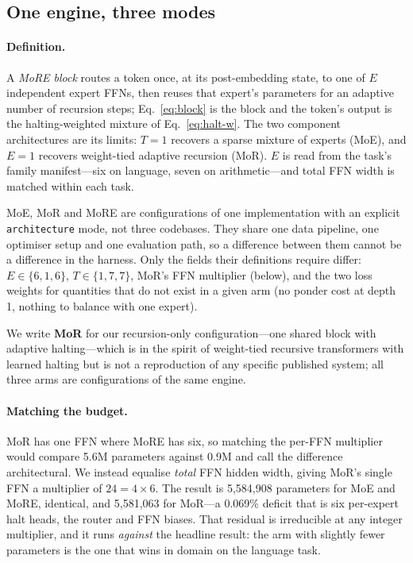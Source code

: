 \subsection{One engine, three modes}
\label{sec:engine}

\paragraph{Definition.}
A \emph{MoRE block} routes a token once, at its post-embedding state, to one of
$E$ independent expert FFNs, then reuses that expert's parameters for an adaptive
number of recursion steps; Eq.~\ref{eq:block} is the block and the token's output
is the halting-weighted mixture of Eq.~\ref{eq:halt-w}. The two component
architectures are its limits: $T=1$ recovers a sparse mixture of experts (MoE),
and $E=1$ recovers weight-tied adaptive recursion (MoR). $E$ is read from the
task's family manifest---six on language, seven on arithmetic---and total FFN
width is matched within each task.

MoE, MoR and MoRE are configurations of one implementation with an explicit
\texttt{architecture} mode, not three codebases. They share one data pipeline, one
optimiser setup and one evaluation path, so a difference between them cannot be a
difference in the harness. Only the fields their definitions require differ:
$E \in \{6,1,6\}$, $T \in \{1,7,7\}$, MoR's FFN multiplier (below), and the two
loss weights for quantities that do not exist in a given arm (no ponder cost at
depth 1, nothing to balance with one expert).

We write \textbf{MoR} for our recursion-only configuration---one shared block with
adaptive halting---which is in the spirit of weight-tied recursive transformers
with learned halting \citep{dehghani2019ut,bae2025mor} but is not a reproduction
of any specific published system; all three arms are configurations of the same
engine.

\paragraph{Matching the budget.} MoR has one FFN where MoRE has six, so matching
the per-FFN multiplier would compare 5.6M parameters against 0.9M and call the
difference architectural. We instead equalise \emph{total} FFN hidden width,
giving MoR's single FFN a multiplier of $24 = 4 \times 6$. The result is
5{,}584{,}908 parameters for MoE and MoRE, identical, and 5{,}581{,}063 for MoR---a
0.069\% deficit that is six per-expert halt heads, the router and FFN biases. That
residual is irreducible at any integer multiplier, and it runs \emph{against} the
headline result: the arm with slightly fewer parameters is the one that wins in
domain on the language task.
